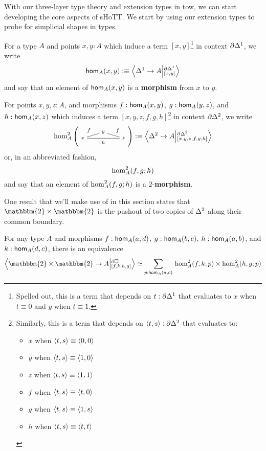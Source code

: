 \documentclass[main.tex]{subfiles}
\begin{document}
With our three-layer type theory and extension types in tow, we can start developing the core aspects of sHoTT. We start by using our extension types
to probe for simplicial shapes in types.

\begin{definition}
    For a type $A$ and points $x,y : A$ which induce a term $[x,y]$\footnote{Spelled out, this is a term that depends on $t : \pardo $ that evaluates to $x$ when $t \equiv 0$ and $y$ when $t \equiv 1$.} in context $\pardo$, we write
    $$\ho[A]{x}{y} \defeq \ndexten{\osx}{A}{\pardo}{[x,y]}$$
    and say that an element of $\ho[A]{x}{y}$ is a \textbf{morphism} from $x$ to $y$. 
\end{definition}
\begin{definition}
    For points $x,y,z : A$, and morphisms $f : \ho[A]{x}{y}$, $g : \ho[A]{y}{z}$, and $h : \ho[A]{x}{z}$ which induces a term $[x,y,z,f,g,h]$\footnote{Similarly, this is a term that depends on $\pair{t}{s} :\pardt$ that evaluates to:
    \begin{itemize}
        \item $x$ when $\pair{t}{s} \equiv \pair{0}{0}$ 
        \item $y$ when $\pair{t}{s} \equiv \pair{1}{0}$ 
        \item $z$ when $\pair{t}{s} \equiv \pair{1}{1}$
        \item $f$ when $\pair{t}{s} \equiv \pair{t}{0}$
        \item $g$ when $\pair{t}{s} \equiv \pair{1}{s}$
        \item $h$ when $\pair{t}{s} \equiv \pair{t}{t}$
    \end{itemize} } in context $\pardt$, we write
    $$\homtwo{A}(x,y,z,f,f,h) \defeq \ndexten{\tsx}{A}{\pardt}{[x,y,z,f,g,h]}$$
    or, in an abbreviated fashion,
    $$\homtwoshort{A}(x,y,z,f,g,h)$$
    and say that an element of $\homtwoshort{A}(x,y,z,f,g,h)$ is a $2$-\textbf{morphism}.
\end{definition}
One result that we'll make use of in this section states that $\mathbbm{2} \times \mathbbm{2}$ is the pushout of two copies of $\tsx$ along their common boundary.
\begin{lemma}
    For any type $A$ and morphisms $f : \ho[A]{a}{d}$, $g : \ho[A]{b}{c}$, $h : \ho[A]{a}{b}$, and $k : \ho[A]{d}{c}$, there is an equivalence 
    $$\ndexten{\mathbbm{2}\times\mathbbm{2}}{A}{\partial \square}{[f,k,h,g]} \simeq \sm{p : \ho[A]{a}{c}}\homtwoshort{A}(a,d,c,f,k,p) \times \homtwoshort{A}(a,b,c,h,g,p)  $$
\end{lemma}
\end{document}

